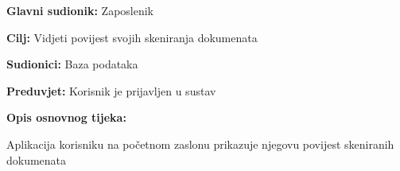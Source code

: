 					\noindent {}
					\begin{packed_item}
	
						\item \textbf{Glavni sudionik:} Zaposlenik
						\item  \textbf{Cilj:} Vidjeti povijest svojih skeniranja dokumenata
						\item  \textbf{Sudionici:} Baza podataka
						\item  \textbf{Preduvjet:} Korisnik je prijavljen u sustav
						\item  \textbf{Opis osnovnog tijeka:}
						
						\item[] \begin{packed_enum}
	
							\item Aplikacija korisniku na početnom zaslonu prikazuje njegovu povijest skeniranih dokumenata

						\end{packed_enum}

					\end{packed_item}


